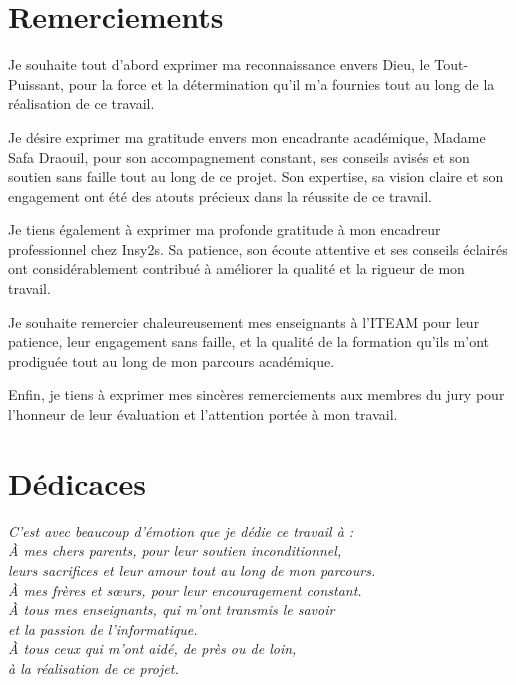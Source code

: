 \documentclass[a4paper,12pt]{report}
\begin{document}
\newpage
\thispagestyle{empty}
\chapter*{Remerciements}

Je souhaite tout d'abord exprimer ma reconnaissance envers Dieu, le Tout-Puissant, pour la force et la d\'{e}termination qu'il m'a fournies tout au long de la r\'{e}alisation de ce travail.

Je d\'{e}sire exprimer ma gratitude envers mon encadrante acad\'{e}mique, Madame Safa Draouil, pour son accompagnement constant, ses conseils avis\'{e}s et son soutien sans faille tout au long de ce projet. Son expertise, sa vision claire et son engagement ont \'{e}t\'{e} des atouts pr\'{e}cieux dans la r\'{e}ussite de ce travail.

Je tiens \'{e}galement \`{a} exprimer ma profonde gratitude \`{a} mon encadreur professionnel chez Insy2s. Sa patience, son \'{e}coute attentive et ses conseils \'{e}clair\'{e}s ont consid\'{e}rablement contribu\'{e} \`{a} am\'{e}liorer la qualit\'{e} et la rigueur de mon travail.

Je souhaite remercier chaleureusement mes enseignants \`{a} l'ITEAM pour leur patience, leur engagement sans faille, et la qualit\'{e} de la formation qu'ils m'ont prodigu\'{e}e tout au long de mon parcours acad\'{e}mique.

Enfin, je tiens \`{a} exprimer mes sinc\`{e}res remerciements aux membres du jury pour l'honneur de leur \'{e}valuation et l'attention port\'{e}e \`{a} mon travail.

\newpage
\thispagestyle{empty}
\chapter*{D\'{e}dicaces}
\vspace*{2cm}
\begin{center}
\textit{C'est avec beaucoup d'\'{e}motion que je d\'{e}die ce travail \`{a} :}\\[1cm]

\textit{\`{A} mes chers parents, pour leur soutien inconditionnel,}\\[0.4cm]
\textit{leurs sacrifices et leur amour tout au long de mon parcours.}\\[0.8cm]

\textit{\`{A} mes fr\`{e}res et s\oe urs, pour leur encouragement constant.}\\[0.8cm]

\textit{\`{A} tous mes enseignants, qui m'ont transmis le savoir}\\[0.4cm]
\textit{et la passion de l'informatique.}\\[0.8cm]

\textit{\`{A} tous ceux qui m'ont aid\'{e}, de pr\`{e}s ou de loin,}\\[0.4cm]
\textit{\`{a} la r\'{e}alisation de ce projet.}
\end{center}
\end{document}
